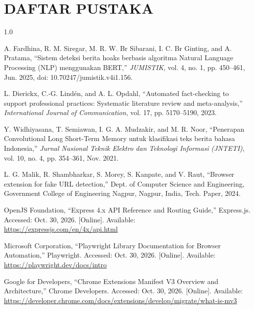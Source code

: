 \documentclass[12pt,a4paper,twoside]{report}
\begin{document}
\chapter*{DAFTAR PUSTAKA}

\begingroup
\raggedright
\begin{spacing}{1.0}
\begin{enumerate}[label={[\arabic*]},leftmargin=0.9cm,itemsep=5pt,topsep=2pt]
  \item A. Fardhina, R. M. Siregar, M. R. W. Br Sibarani, I. C. Br Ginting, and A. Pratama, ``Sistem deteksi berita hoaks berbasis algoritma Natural Language Processing (NLP) menggunakan BERT,'' \textit{JUMISTIK}, vol. 4, no. 1, pp. 450--461, Jun. 2025, doi: 10.70247/jumistik.v4i1.156.

  \item L. Dierickx, C.-G. Lind\'{e}n, and A. L. Opdahl, ``Automated fact-checking to support professional practices: Systematic literature review and meta-analysis,'' \textit{International Journal of Communication}, vol. 17, pp. 5170--5190, 2023.

  \item Y. Widhiyasana, T. Semiawan, I. G. A. Mudzakir, and M. R. Noor, ``Penerapan Convolutional Long Short-Term Memory untuk klasifikasi teks berita bahasa Indonesia,'' \textit{Jurnal Nasional Teknik Elektro dan Teknologi Informasi (JNTETI)}, vol. 10, no. 4, pp. 354--361, Nov. 2021.

  \item L. G. Malik, R. Shambharkar, S. Morey, S. Kanpate, and V. Raut, ``Browser extension for fake URL detection,'' Dept. of Computer Science and Engineering, Government College of Engineering Nagpur, Nagpur, India, Tech. Paper, 2024.

  \item OpenJS Foundation, ``Express 4.x API Reference and Routing Guide,'' Express.js. Accessed: Oct. 30, 2026. [Online]. Available: \url{https://expressjs.com/en/4x/api.html}

  \item Microsoft Corporation, ``Playwright Library Documentation for Browser Automation,'' Playwright. Accessed: Oct. 30, 2026. [Online]. Available: \url{https://playwright.dev/docs/intro}

  \item Google for Developers, ``Chrome Extensions Manifest V3 Overview and Architecture,'' Chrome Developers. Accessed: Oct. 30, 2026. [Online]. Available: \url{https://developer.chrome.com/docs/extensions/develop/migrate/what-is-mv3}


\end{enumerate}
\end{spacing}
\end{document}
